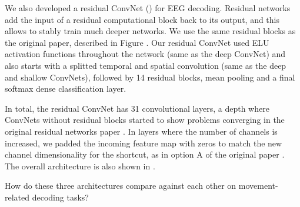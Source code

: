     We also developed a residual ConvNet (\citep{he_deep_2015})
for EEG decoding. Residual networks add the input of a residual
computational block back to its output, and this allows to stably train
much deeper networks. We use the same residual blocks as the original
paper, described in Figure . Our
residual ConvNet used ELU activation functions throughout the network
(same as the deep ConvNet) and also starts with a splitted temporal and
spatial convolution (same as the deep and shallow ConvNets), followed by
14 residual blocks, mean pooling and a final softmax dense
classification layer.

In total, the residual ConvNet has 31 convolutional layers, a depth
where ConvNets without residual blocks started to show problems
converging in the original residual networks paper
\citep{he_deep_2015}. In layers where the number of channels
is increased, we padded the incoming feature map with zeros to match the
new channel dimensionality for the shortcut, as in option A of the
original paper \citep{he_deep_2015}. The overall architecture is also shown in
.

\begin{openbox}
\item How do these three architectures compare against each other on movement-related decoding tasks?
\end{openbox}
